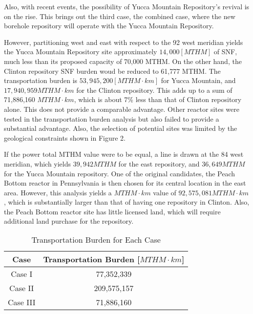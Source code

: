 Also, with recent events, the possibility of Yucca Mountain Repository's revival
is on the rise. This brings out the third case, the combined case, where the new
borehole repository will operate with the Yucca Mountain Repository. 


However, partitioning west and east with respect to the 92 west meridian yields the Yucca
Mountain Repository site approximately 
$14,000 [MTHM]$ of \gls{SNF}, much less than its proposed capacity of 70,000 MTHM. On the other hand, 
the Clinton repository \gls{SNF} burden woud be reduced to 61,777 MTHM. The transportation burden is 
$53,945,200 [MTHM\cdot km]$  
for Yucca Mountain, and $17,940,959 MTHM\cdot km$ for the Clinton repository. This 
adds up to a sum of 71,886,160 $MTHM\cdot km$, which is about 7\% less than that
of Clinton repository alone. This does not provide a comparable advantage. Other
reactor sites were tested in the transportation burden analysis but also failed
to provide a substantial advantage. Also, the selection of potential sites
was limited by the geological constraints shown in Figure 2.  

If the power total MTHM value were to be equal, a line is drawn at the 84 west
meridian, which yields $39,942 MTHM$ for the east repository, and $36,649 MTHM$ for
the Yucca Mountain repository. One of the original candidates, the Peach Bottom
reactor in Pennsylvania is then chosen for its central location in the east area.
However, this analysis yields a $MTHM\cdot km$ value of $92,575,081 MTHM\cdot km$,
which is substantially larger than that of having one repository in Clinton. 
Also, the Peach Bottom reactor site has little licensed land, which will require
additional land purchase for the repository. 


  


\begin{table}[h]
	\centering
        \caption {Transportation Burden for Each Case}
		\begin{tabular}{|c|c|}
			\hline
			Case & Transportation Burden [$MTHM\cdot km$]\\
			\hline
			Case I & 77,352,339 \\
			Case II & 209,575,157 \\
			Case III & 71,886,160\\ 
                        \hline
                \end{tabular}
\end{table}
  

